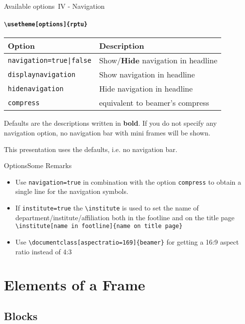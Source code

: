 \begin{frame}{Available options~IV - Navigation}
	\framesubtitle{\texttt{\textbackslash usetheme[options]\{rptu\}}}
	\begin{tabular}{ll}
		\textbf{Option} & \textbf{Description}\\ \toprule
		\texttt{navigation=true|false} &Show/\textbf{Hide} navigation in headline \\
		\texttt{displaynavigation} & Show navigation in headline \\ 
		\texttt{hidenavigation} & Hide navigation in headline \\  \midrule
		\texttt{compress} & equivalent to beamer's compress \\\bottomrule
	\end{tabular}
	\vspace*{2ex}
	
	Defaults are the descriptions written in \textbf{bold}. If you do not specify any navigation option, no navigation bar with mini frames will be shown.
	
	This presentation uses the defaults, i.e. no navigation bar.
\end{frame}


\begin{frame}{Options}{Some Remarks}
	\begin{itemize}
		\item Use \texttt{navigation=true} in combination with the option \texttt{compress} to obtain a single line for the navigation symbols.
		\item If \texttt{institute=true} the \texttt{\textbackslash institute} is used to set the name of department/institute/affiliation both in the footline and on the title page\\
		\texttt{\textbackslash institute[name in footline]\{name on title page\}}
		\item Use \texttt{\textbackslash documentclass[aspectratio=169]\{beamer\}} for getting a 16:9 aspect ratio instead of 4:3
	\end{itemize}
\end{frame}

\section{Elements of a Frame}
\subsection{Blocks}
\rptusectionpage

